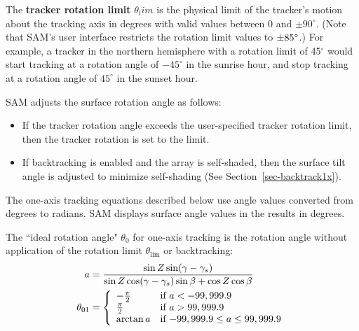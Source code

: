 \documentclass[12pt,letterpaper]{article}
\begin{document}
The \textbf{tracker rotation limit} $\theta_lim$ is the physical limit of the tracker's motion about the tracking axis in degrees with valid values between $0$ and $\pm 90^\circ$. (Note that SAM's user interface restricts the rotation limit values to $\pm 85\degree$.) For example, a tracker in the northern hemisphere with a rotation limit of 45$^\circ$ would start tracking at a rotation angle of $-45^\circ$ in the sunrise hour, and stop tracking at a rotation angle of $45^\circ$ in the sunset hour.

SAM adjusts the surface rotation angle as follows:
\begin{itemize}
\item If the tracker rotation angle exceeds the user-specified tracker rotation limit, then the tracker rotation is set to the limit.
\item If backtracking is enabled and the array is self-shaded, then the surface tilt angle is adjusted to minimize self-shading (See Section~\ref{sec-backtrack1x}).
\end{itemize}

The one-axis tracking equations described below use angle values converted from degrees to radians. SAM displays surface angle values in the results in degrees.

The ``ideal rotation angle" $\theta_0$ for one-axis tracking is the rotation angle without application of the rotation limit $\theta_{\mathrm{lim}}$ or backtracking:
\begin{align}
a &= \frac{\sin Z \sin(\gamma - \gamma_s)}{\sin Z \cos(\gamma - \gamma_s) \sin\beta + \cos Z \cos\beta} \notag\\
\theta_{\mathrm{01}} &= \left\{
\begin{array}{ll}
-\frac{\pi}{2} & \text{if $a<-99,999.9$}\\
\frac{\pi}{2} & \text{if $a>99,999.9$}\\
\arctan a & \text{if $-99,999.9 \leq a \leq 99,999.9$}
\end{array}
\right.
\end{align}
\end{document}
